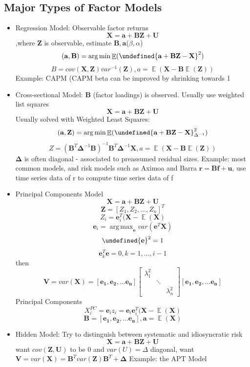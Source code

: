 \documentclass[11pt, openany]{book}              %
\let\norm\undefined %
\DeclarePairedDelimiter\norm{\lVert}{\rVert}
\DeclareMathOperator*{\argmax}{arg\,max}  %
\DeclareMathOperator*{\argmin}{arg\,min}  %
\DeclareMathOperator{\E}{\mathbb{E}}
\begin{document}
\subsection{Major Types of Factor Models}

\begin{itemize}
	\item Regression Model: Observable factor returns
	$$ \mathbf{X} =  \mathbf{a} +  \mathbf{BZ} +  \mathbf{U}$$ ,where $\mathbf{Z}$ is observable, estimate $\mathbf{B, a}$($\beta, \alpha$)
	$$(\mathbf{a,B}) = \argmin \E( \norm{\mathbf{a} + \mathbf{BZ} - \mathbf{X}}^2)$$
	$$ B = cov(\mathbf{X,Z}) var^{-1} (\mathbf{Z}), a = \E(\mathbf{X} - \mathbf{B}\E(\mathbf{Z}))$$
	Example: CAPM (CAPM beta can be improved by shrinking towards 1
	\item Cross-sectional Model: $\mathbf{B}$ (factor loadings) is observed. Usually use weighted list squares
	$$ \mathbf{X} =  \mathbf{a} +  \mathbf{BZ} +  \mathbf{U}$$ 
	Usually solved with Weighted Least Squares:
	$$(\mathbf{a,Z}) = \argmin \E( \norm{\mathbf{a} + \mathbf{BZ} - \mathbf{X}}^2_{\Delta^{-1}})$$
	$$ Z = (\mathbf{B}^T \mathbf{\Delta}^{-1} \mathbf{B})^{-1} \mathbf{B}^T \mathbf{\Delta}^{-1} \mathbf{X}, a = \E(\mathbf{X} - \mathbf{B}\E(\mathbf{Z}))$$
	$\mathbf{\Delta}$ is often diagonal - associated to preassumed residual sizes.
	Example: most common models, and risk models such as Aximoa and Barra $\mathbf{r} = \mathbf{Bf} + \mathbf{u}$, use time series data of r to compute time series data of f
	
	\item Principal Components Model
	$$ \mathbf{X} =  \mathbf{a} +  \mathbf{BZ} +  \mathbf{U}$$
	 $$\mathbf{Z} = [Z_1, Z_2, ..., Z_n]^T$$
	 $$ Z_i = \mathbf{e}_i^T(\mathbf{X} - \E(\mathbf{X})$$
	 $$ \mathbf{e}_i = \argmax _{\mathbf{e}} var(\mathbf{e}^T\mathbf{X})$$
	 $$\norm{\mathbf{e}}^2 = 1$$
	 $$ \mathbf{e}_k^T \mathbf{e} = 0, k = 1,...,i-1$$
	 then 
	 $$\mathbf{V} = var(\mathbf{X}) = [\mathbf{e_1}, \mathbf{e_2},...\mathbf{e_n}]
	 \begin{bmatrix} 
  				 \lambda_1^2 & & \\ 
  				  & \ddots & \\
  				 &  & \lambda_n^2
	\end{bmatrix} [\mathbf{e_1}, \mathbf{e_2},...\mathbf{e_n}]
	 $$
	 Principal Components
	 $$X_i^{PC} = \mathbf{e}_i z_i = \mathbf{e}_i \mathbf{e}_i^ T(\mathbf{X} - \E( \mathbf{X})$$
	 $$\mathbf{B}= [\mathbf{e_1}, \mathbf{e_2},...\mathbf{e_n}], \mathbf{a} = \E( \mathbf{X})$$
	 
	\item Hidden Model: Try to distinguish between systematic and idiosyncratic risk 
	$$ \mathbf{X} =  \mathbf{a} +  \mathbf{BZ} +  \mathbf{U}$$ 
	want $cov(\mathbf{Z}, \mathbf{U})$ to be 0 and $var(U) = \Delta$ diagonal,
	want $\mathbf{V} = var(\mathbf{X}) = \mathbf{B}^T var(\mathbf{Z}) \mathbf{B}^T + \mathbf{\Delta}$
	Example: the APT Model
\end{itemize}
\end{document}
